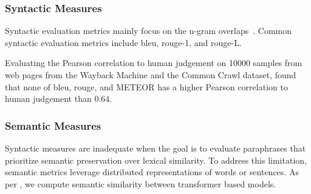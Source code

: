 

\subsubsection{Syntactic Measures}
Syntactic evaluation metrics mainly focus on the n-gram overlaps~\citep{zhou_paraphrase_2021}. 
Common syntactic evaluation metrics include \acs{bleu}, \acs{rouge}-1, and \acs{rouge}-L.





Evaluating the Pearson correlation to human judgement on \num{10000} samples from web pages from the Wayback Machine and the Common Crawl dataset, \citet{anantha_pearson_metrics_2021} found that none of \ac{bleu}, \ac{rouge}, and METEOR has a higher Pearson correlation to human judgement than $0.64$.


\subsubsection{Semantic Measures}
Syntactic measures are inadequate when the goal is to evaluate paraphrases that prioritize semantic preservation over lexical similarity. 
To address this limitation, semantic metrics leverage distributed representations of words or sentences.
As per \citet{gohsen_captions_2023}, we compute semantic similarity between transformer based models.

